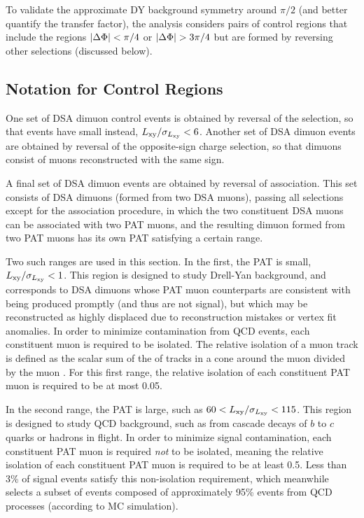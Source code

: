 \pagebreak
To validate the approximate DY background symmetry around $\pi/2$ (and better quantify the transfer factor), the analysis considers pairs of control regions that include the regions $|\Delta\Phi| < \pi/4$ or $|\Delta\Phi| > 3\pi/4$ but are formed by reversing other selections (discussed below).

\subsection{Notation for Control Regions}
One set of DSA dimuon control events is obtained by reversal of the \LxySig selection, so that events have small \LxySig instead, \eg $L_{\mathrm{xy}}/\sigma_{L_{\mathrm{xy}}} < 6$.
Another set of DSA dimuon events are obtained by reversal of the opposite-sign charge selection, so that dimuons consist of muons reconstructed with the same sign.

A final set of DSA dimuon events are obtained by reversal of \DSAToPAT association.
This set consists of DSA dimuons (formed from two DSA muons), passing all selections except for the \DSAToPAT association procedure, in which the two constituent DSA muons can be associated with two PAT muons, and the resulting dimuon formed from two PAT muons has its own PAT \LxySig satisfying a certain range.

Two such ranges are used in this section.
In the first, the PAT \LxySig is small, \eg $L_{\mathrm{xy}}/\sigma_{L_{\mathrm{xy}}} < 1$.
This region is designed to study Drell-Yan background, and corresponds to DSA dimuons whose PAT muon counterparts are consistent with being produced promptly (and thus are not signal), but which may be reconstructed as highly displaced due to reconstruction mistakes or vertex fit anomalies.
In order to minimize contamination from QCD events, each constituent muon is required to be isolated.
The relative isolation of a muon track is defined as the scalar sum of the \pT of tracks in a \DeltaR cone around the muon divided by the muon \pT.
For this first range, the relative isolation of each constituent PAT muon is required to be at most 0.05.

In the second range, the PAT \LxySig is large, such as \mbox{$60 < L_{\mathrm{xy}}/\sigma_{L_{\mathrm{xy}}} < 115$}.
This region is designed to study QCD background, such as from cascade decays of $b$ to $c$ quarks or hadrons in flight.
In order to minimize signal contamination, each constituent PAT muon is required \emph{not} to be isolated, meaning the relative isolation of each constituent PAT muon is required to be at least 0.5.
Less than 3\% of \twoMu signal events satisfy this non-isolation requirement, which meanwhile selects a subset of events composed of approximately 95\% events from QCD processes (according to MC simulation).

